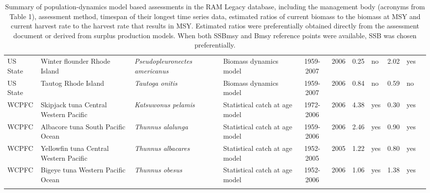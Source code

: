 \begin{longtable}{p{1.8cm}p{3.5cm}p{3.5cm}p{3cm}cccp{0.9cm}cp{0.9cm}c}
  US State & Winter flounder Rhode Island & \textit{Pseudopleuronectes americanus} & Biomass dynamics model & 1959-2007 & 2006 & 0.25 & no & 2.02 & yes & \cite{NA} \\ 
  US State & Tautog Rhode Island & \textit{Tautoga onitis} & Biomass dynamics model & 1959-2007 & 2006 & 0.84 & no & 0.59 & no & \cite{NA} \\ 
  WCPFC & Skipjack tuna Central Western Pacific & \textit{Katsuwonus pelamis} & Statistical catch at age model & 1972-2006 & 2006 & 4.38 & yes & 0.30 & yes & \cite{SC4-SA-WP4-SKJ-Assessment-rev1-skipjack.pdf} \\ 
  WCPFC & Albacore tuna South Pacific Ocean & \textit{Thunnus alalunga} & Statistical catch at age model & 1959-2006 & 2006 & 2.46 & yes & 0.90 & yes & \cite{JENSEN_ALBWPO_2008.pdf} \\ 
  WCPFC & Yellowfin tuna Central Western Pacific & \textit{Thunnus albacares} & Statistical catch at age model & 1952-2005 & 2005 & 1.22 & yes & 0.80 & yes & \cite{WCPFC-SC3-SA-SWG-WP-01.pdf} \\ 
  WCPFC & Bigeye tuna Western Pacific Ocean & \textit{Thunnus obesus} & Statistical catch at age model & 1952-2006 & 2006 & 1.06 & yes & 1.38 & yes & \cite{SC4-SA-WP1-rev1-bigeye-tuna.pdf} \\ 
   \hline
\hline
\caption{Summary of population-dynamics model based assessments in the RAM Legacy database, including the management body (acronyms from Table 1), assessment method, timespan of their longest time series data, estimated ratios of current biomass to the biomass at MSY and current harvest rate to the harvest rate that results in MSY. Estimated ratios were preferentially obtained directly from the assessment document or derived from surplus production models. When both SSBmsy and Bmsy reference points were available, SSB was chosen preferentially.}
\label{tab:crosshair}
\end{longtable}
